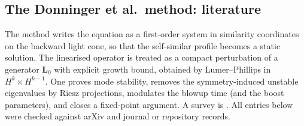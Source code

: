 \subsection{The Donninger et al.\ method: literature}
\label{lit:donninger}
The method writes the equation as a first-order system in similarity
coordinates on the backward light cone, so that the self-similar profile
becomes a static solution. The linearised operator is treated as a
compact perturbation of a generator $\mathbf L_0$ with explicit growth
bound, obtained by Lumer--Phillips in $H^k\times H^{k-1}$. One proves mode
stability, removes the symmetry-induced unstable eigenvalues by Riesz
projections, modulates the blowup time (and the boost parameters), and
closes a fixed-point argument. A survey is \cite{Donninger2024}. All
entries below were checked against arXiv and journal or repository records.
